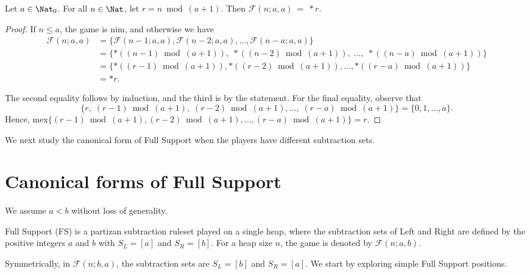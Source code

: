 \documentclass[oneside,reqno]{amsart}
\newcommand{\fs}{\mathcal{F}}
\begin{document}
\begin{theorem}[Impartial FS]\label{thm: CF of FS for equal wealth}
Let $a\in\Nat_0$. For all  $n\in \Nat$,  let $r=n \bmod (a+1)$. Then $\fs(n;a,a)~=~*r.$
\end{theorem}
\begin{proof}

If $n\le a$, the game is {\sc nim}, and otherwise we  have 
\begin{align*}
\fs(n;a,a)
&= \{\fs(n-1;a,a), \fs(n-2;a,a), \dots, \fs(n-a;a,a)\} \\
&=\{*((n-1)\bmod (a+1)),\;*((n-2)\bmod(a+1)),\; \dots,\; *((n-a)\bmod(a+1))\}\\
&= \{*((r-1)\bmod(a+1)), *((r-2)\bmod(a+1)), \dots, *((r-a)\bmod(a+1))\} \\
&= *r.
\end{align*}

The second equality follows by induction, and the third is by the statement. For the final equality, observe that
\[
\{r,\; (r-1)\bmod(a+1),\; (r-2)\bmod(a+1), \dots,\; (r-a)\bmod(a+1)\}
= \{0,1,\dots,a\}.
\]
Hence, $\mathrm{mex}\{(r-1)\bmod(a+1), (r-2)\bmod(a+1), \dots, (r-a)\bmod(a+1)\}=r$.
\end{proof}

We next study the canonical form of {\sc Full Support} when the players have different subtraction sets.

\section{Canonical forms of Full Support}\label{sec: CF of FS}

We assume $a<b$ without loss of generality. 
\begin{definition}
    {\sc Full Support} ({\sc FS}) is a partizan subtraction ruleset played on a single heap, where the subtraction sets of Left and Right are defined by the positive integers $a$ and $b$ with $S_L=[a]$ and $S_R=[b]$. For a heap size $n$, the game is denoted by $\fs(n;a,b)$.
\end{definition}

Symmetrically, in $\fs(n;b,a)$, the subtraction sets are $S_L=[b]$ and $S_R=[a]$.
We start by exploring simple {\sc Full Support} positions.
\end{document}
